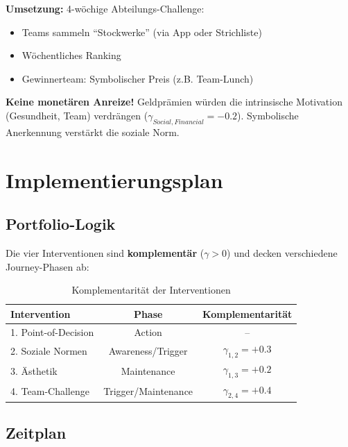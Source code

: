 \documentclass[11pt,a4paper]{article}
\begin{document}
\textbf{Umsetzung:} 4-wöchige Abteilungs-Challenge:
\begin{itemize}
    \item Teams sammeln ``Stockwerke'' (via App oder Strichliste)
    \item Wöchentliches Ranking
    \item Gewinnerteam: Symbolischer Preis (z.B. Team-Lunch)
\end{itemize}

\begin{tcolorbox}[warning={Crowding-Out Risiko}]
\textbf{Keine monetären Anreize!} Geldprämien würden die intrinsische Motivation (Gesundheit, Team) verdrängen ($\gamma_{Social,Financial} = -0.2$). Symbolische Anerkennung verstärkt die soziale Norm.
\end{tcolorbox}

\newpage

\section{\textcolor{fehrblue}{Implementierungsplan}}

\subsection{Portfolio-Logik}

Die vier Interventionen sind \textbf{komplementär} ($\gamma > 0$) und decken verschiedene Journey-Phasen ab:

\begin{table}[h]
\centering
\begin{tabular}{lcc}
\toprule
\textbf{Intervention} & \textbf{Phase} & \textbf{Komplementarität} \\
\midrule
1. Point-of-Decision & Action & -- \\
2. Soziale Normen & Awareness/Trigger & $\gamma_{1,2} = +0.3$ \\
3. Ästhetik & Maintenance & $\gamma_{1,3} = +0.2$ \\
4. Team-Challenge & Trigger/Maintenance & $\gamma_{2,4} = +0.4$ \\
\bottomrule
\end{tabular}
\caption{Komplementarität der Interventionen}
\end{table}

\subsection{Zeitplan}
\end{document}
